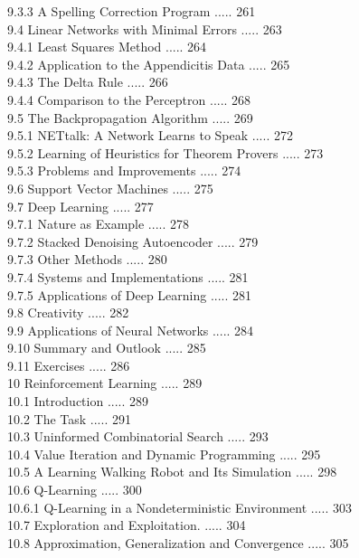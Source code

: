 \documentclass[10pt]{article}
\begin{document}
9.3.3 A Spelling Correction Program ..... 261\\
9.4 Linear Networks with Minimal Errors ..... 263\\
9.4.1 Least Squares Method ..... 264\\
9.4.2 Application to the Appendicitis Data ..... 265\\
9.4.3 The Delta Rule ..... 266\\
9.4.4 Comparison to the Perceptron ..... 268\\
9.5 The Backpropagation Algorithm ..... 269\\
9.5.1 NETtalk: A Network Learns to Speak ..... 272\\
9.5.2 Learning of Heuristics for Theorem Provers ..... 273\\
9.5.3 Problems and Improvements ..... 274\\
9.6 Support Vector Machines ..... 275\\
9.7 Deep Learning ..... 277\\
9.7.1 Nature as Example ..... 278\\
9.7.2 Stacked Denoising Autoencoder ..... 279\\
9.7.3 Other Methods ..... 280\\
9.7.4 Systems and Implementations ..... 281\\
9.7.5 Applications of Deep Learning ..... 281\\
9.8 Creativity ..... 282\\
9.9 Applications of Neural Networks ..... 284\\
9.10 Summary and Outlook ..... 285\\
9.11 Exercises ..... 286\\
10 Reinforcement Learning ..... 289\\
10.1 Introduction ..... 289\\
10.2 The Task ..... 291\\
10.3 Uninformed Combinatorial Search ..... 293\\
10.4 Value Iteration and Dynamic Programming ..... 295\\
10.5 A Learning Walking Robot and Its Simulation ..... 298\\
10.6 Q-Learning ..... 300\\
10.6.1 Q-Learning in a Nondeterministic Environment ..... 303\\
10.7 Exploration and Exploitation. ..... 304\\
10.8 Approximation, Generalization and Convergence ..... 305\\
\end{document}
